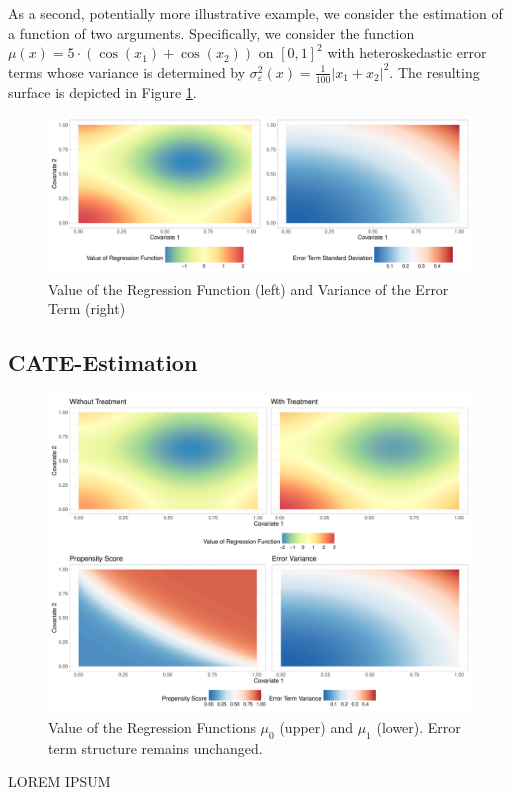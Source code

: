 As a second, potentially more illustrative example, we consider the estimation of a function of two arguments.
Specifically, we consider the function $\mu(x) = 5 \cdot \left(\cos(x_1) + \cos(x_2)\right)$ on $[0,1]^2$ with heteroskedastic error terms whose variance is determined by $\sigma_{\varepsilon}^2(x) = \frac{1}{100}\left|x_1 + x_2\right|^2$.
The resulting surface is depicted in Figure \ref{fig:reg_surface}.
\begin{figure}[H]
	\centering
	\includegraphics[width = \textwidth]{../Graphics/Reg_Exmp1.pdf}
	\caption{Value of the Regression Function (left) and Variance of the Error Term (right)}
	\label{fig:reg_surface}
\end{figure}

\subsection{CATE-Estimation}

\begin{figure}[H]
	\centering
	\includegraphics[width = \textwidth]{../Graphics/CATE_Exmp1.pdf}
	\caption{Value of the Regression Functions $\mu_0$ (upper) and $\mu_1$ (lower).	Error term structure remains unchanged.}
	\label{fig:CATE_surfaces}
\end{figure}

{\color{red} LOREM IPSUM}